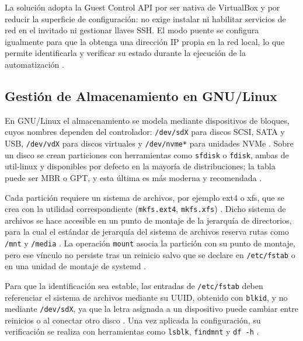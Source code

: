 La solución adopta la Guest Control API por ser nativa de VirtualBox y por reducir la superficie de configuración: no exige instalar ni habilitar servicios de red en el invitado ni gestionar llaves SSH. El modo puente se configura igualmente para que la \vm{} obtenga una dirección IP propia en la red local, lo que permite identificarla y verificar su estado durante la ejecución de la automatización \parencite{virtualbox_networking, virtualbox_guestcontrol}.

\subsection{Gestión de Almacenamiento en GNU/Linux}

En GNU/Linux el almacenamiento se modela mediante dispositivos de bloques, cuyos nombres dependen del controlador: \texttt{/dev/sdX} para discos SCSI, SATA y USB, \texttt{/dev/vdX} para discos virtuales y \texttt{/dev/nvme*} para unidades NVMe \parencite{kernel_block_devices}. Sobre un disco se crean particiones con herramientas como \texttt{sfdisk} o \texttt{fdisk}, ambas de util-linux y disponibles por defecto en la mayoría de distribuciones; la tabla puede ser MBR o GPT, y esta última es más moderna y recomendada \parencite{linux_storage_management}.

Cada partición requiere un sistema de archivos, por ejemplo ext4 o xfs, que se crea con la utilidad correspondiente (\texttt{mkfs.ext4}, \texttt{mkfs.xfs}) \parencite{linux_storage_management}. Dicho sistema de archivos se hace accesible en un punto de montaje de la jerarquía de directorios, para la cual el estándar de jerarquía del sistema de archivos reserva rutas como \texttt{/mnt} y \texttt{/media} \parencite{lsb_fhs}. La operación \texttt{mount} asocia la partición con su punto de montaje, pero ese vínculo no persiste tras un reinicio salvo que se declare en \texttt{/etc/fstab} o en una unidad de montaje de systemd \parencite{linux_storage_management, systemd_mount}.

Para que la identificación sea estable, las entradas de \texttt{/etc/fstab} deben referenciar el sistema de archivos mediante su UUID, obtenido con \texttt{blkid}, y no mediante \texttt{/dev/sdX}, ya que la letra asignada a un dispositivo puede cambiar entre reinicios o al conectar otro disco \parencite{uuid_fstab}. Una vez aplicada la configuración, su verificación se realiza con herramientas como \texttt{lsblk}, \texttt{findmnt} y \texttt{df -h} \parencite{linux_storage_management}.

